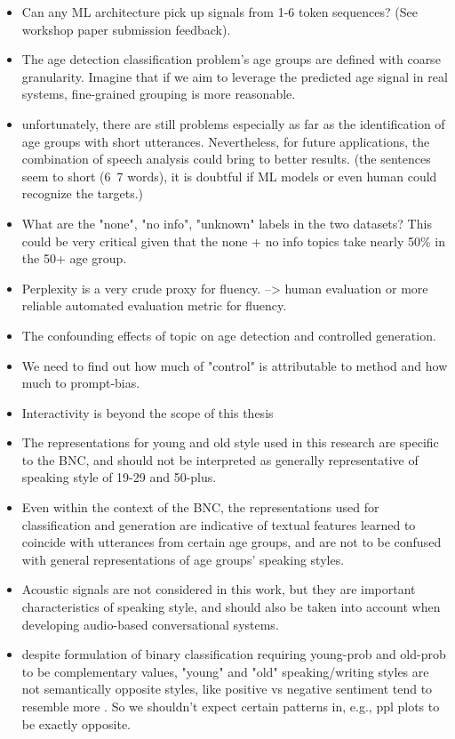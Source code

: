 \begin{itemize}
    \item Can any ML architecture pick up signals from 1-6 token sequences? (See workshop paper submission feedback).
    \item The age detection classification problem's age groups are defined with coarse granularity. Imagine that if we aim to leverage the predicted age signal in real systems, fine-grained grouping is more reasonable.
    \item unfortunately, there are still problems especially as far as the identification of age groups with short utterances. Nevertheless, for future applications, the combination of speech analysis could bring to better results. (the sentences seem to short (6~7 words), it is doubtful if  ML models or even human could recognize the targets.)
    \item What are the "none", "no info", "unknown" labels in the two datasets? This could be very critical given that the none + no info topics take nearly 50\% in the 50+ age group.
    \item Perplexity is a very crude proxy for fluency. --> human evaluation or more reliable automated evaluation metric for fluency.
    \item The confounding effects of topic on age detection and controlled generation.
    \item We need to find out how much of "control" is attributable to method and how much to prompt-bias.
    \item Interactivity is beyond the scope of this thesis
    \item The representations for young and old style used in this research are specific to the BNC, and should not be interpreted as generally representative of speaking style of 19-29 and 50-plus.
    \item Even within the context of the BNC, the representations used for classification and generation are indicative of textual features learned to coincide with utterances from certain age groups, and are not to be confused with general representations of age groups' speaking styles.
    \item Acoustic signals are not considered in this work, but they are important characteristics of speaking style, and should also be taken into account when developing audio-based conversational systems.
    \item despite formulation of binary classification requiring young-prob and old-prob to be complementary values, "young" and "old" speaking/writing styles are not semantically opposite styles, like positive vs negative sentiment tend to resemble more . So we shouldn't expect certain patterns in, e.g., ppl plots to be exactly opposite.
\end{itemize}


